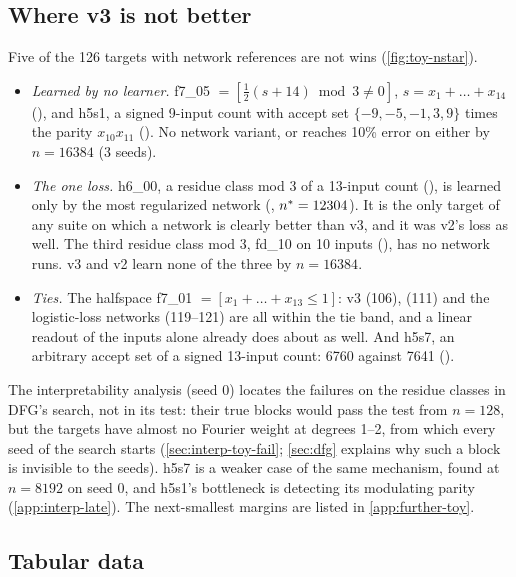 \subsection{Where v3 is not better}\label{sec:res-toy-fail}

Five of the 126 targets with network references are not wins (\cref{fig:toy-nstar}).
\begin{itemize}
\item \emph{Learned by no learner.} f7\_05 $=[\tfrac12(s+14)\bmod3\ne0]$, $s=x_1+\dots+x_{14}$ (), and h5s1, a signed 9-input count with accept set $\{-9,-5,-1,3,9\}$ times the parity $x_{10}x_{11}$ (). No network variant,  or  reaches 10\% error on either by $n=16384$ (3 seeds).
\item \emph{The one loss.} h6\_00, a residue class mod 3 of a 13-input count (), is learned only by the most regularized network (, $n^{*}=12304$). It is the only target of any suite on which a network is clearly better than v3, and it was v2's loss as well. The third residue class mod 3, fd\_10 on 10 inputs (), has no network runs. v3 and v2 learn none of the three by $n=16384$.
\item \emph{Ties.} The halfspace f7\_01 $=[x_1+\dots+x_{13}\le1]$: v3 (106),  (111) and the logistic-loss networks (119--121) are all within the tie band, and a linear readout of the inputs alone already does about as well. And h5s7, an arbitrary accept set of a signed 13-input count: 6760 against 7641 ().
\end{itemize}
The interpretability analysis (seed 0) locates the failures on the residue classes in DFG's search, not in its test: their true blocks would pass the test from $n=128$, but the targets have almost no Fourier weight at degrees 1--2, from which every seed of the search starts (\cref{sec:interp-toy-fail}; \cref{sec:dfg} explains why such a block is invisible to the seeds). h5s7 is a weaker case of the same mechanism, found at $n=8192$ on seed 0, and h5s1's bottleneck is detecting its modulating parity (\cref{app:interp-late}). The next-smallest margins are listed in \cref{app:further-toy}.

\subsection{Tabular data}\label{sec:res-tabular}

